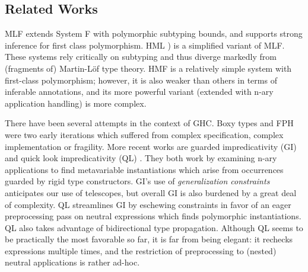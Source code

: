 \documentclass[acmsmall,review,anonymous,prologue,dvipsnames]{acmart}\settopmatter{printfolios=true,printccs=false,printacmref=false}
\theoremstyle{remark}
\begin{document}
\subsection{Related Works}
MLF \cite{le2014mlf} extends System F with polymorphic subtyping
bounds, and supports strong inference for first class polymorphism. HML
\cite{leijen2009flexible}) is a simplified variant of MLF. These systems rely
critically on subtyping and thus diverge markedly from (fragments of) Martin-Löf
type theory. HMF \cite{leijen2008hmf} is a relatively simple system with
first-class polymorphism; however, it is also weaker than others in terms of
inferable annotations, and its more powerful variant (extended with n-ary
application handling) is more complex.

There have been several attempts in the context of GHC. Boxy types
\cite{vytiniotis2006boxy} and FPH \cite{vytiniotis2008fph} were two early
iterations which suffered from complex specification, complex implementation or
fragility. More recent works are guarded impredicativity (GI)
\cite{serrano2018guarded} and quick look impredicativity (QL)
\cite{serrano2020a}. They both work by examining n-ary applications to find
metavariable instantiations which arise from occurrences guarded by rigid type
constructors. GI's use of \emph{generalization constraints} anticipates our use
of telescopes, but overall GI is also burdened by a great deal of complexity. QL
streamlines GI by eschewing constraints in favor of an eager preprocessing pass
on neutral expressions which finds polymorphic instantiations. QL also takes
advantage of bidirectional type propagation.  Although QL seems to be
practically the most favorable so far, it is far from being elegant: it rechecks
expressions multiple times, and the restriction of preprocessing to (nested)
neutral applications is rather ad-hoc.
\end{document}
